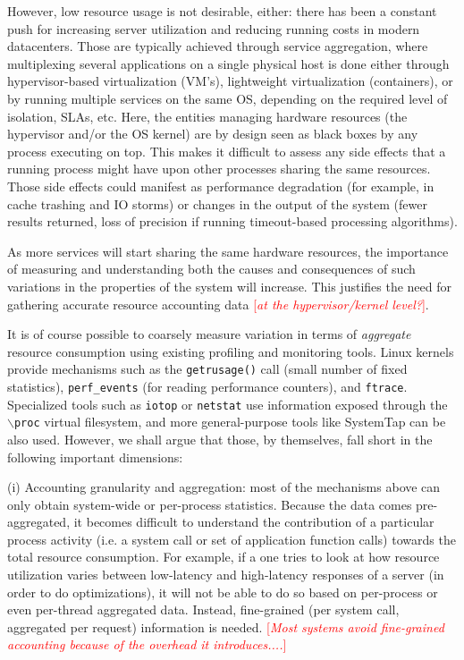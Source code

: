 \documentclass[letterpaper,twocolumn,10pt]{article}
\newcommand{\lnote}[1]{\textcolor{red}{[\textit{#1}]}} %
\begin{document}
However, low resource usage is not desirable, either: there has been a constant push for increasing server utilization and reducing running costs in modern datacenters. Those are typically achieved through service aggregation, where multiplexing several applications on a single physical host is done either through hypervisor-based virtualization (VM's), lightweight virtualization (containers), or by running multiple services on the same OS, depending on the required level of isolation, SLAs, etc. 
Here, the entities managing hardware resources (the hypervisor and/or the OS kernel) are by design seen as black boxes by any process executing on top. This makes it difficult to assess any side effects that a running process might have upon other processes sharing the same resources. Those side effects could manifest as performance degradation (for example, in cache trashing and IO storms) or changes in the output of the system (fewer results returned, loss of precision if running timeout-based processing algorithms).

As more services will start sharing the same hardware resources, the importance of measuring and understanding both the causes and consequences of such variations in the properties of the system will increase. This justifies the need for gathering accurate resource accounting data \lnote{at the hypervisor/kernel level?}.

It is of course possible to coarsely measure variation in terms of \textit{aggregate} resource consumption using existing profiling and monitoring tools. Linux kernels provide mechanisms such as the \texttt{getrusage()} call (small number of fixed statistics), \texttt{perf\_events} (for reading performance counters), and \texttt{ftrace}. Specialized tools such as \texttt{iotop} or \texttt{netstat} use information exposed through the \texttt{$\backslash$proc} virtual filesystem, and more general-purpose tools like SystemTap can be also used. However, we shall argue that those, by themselves, fall short in the following important dimensions: 

(i) Accounting granularity and aggregation: most of the mechanisms above can only obtain system-wide or per-process statistics. Because the data comes pre-aggregated, it becomes difficult to understand the contribution of a particular process activity (i.e. a system call or set of application function calls) towards the total resource consumption. For example, if a one tries to look at how resource utilization varies between low-latency and high-latency responses of a server (in order to do optimizations), it will not be able to do so based on per-process or even per-thread aggregated data. Instead, fine-grained (per system call, aggregated per request) information is needed. \lnote{Most systems avoid fine-grained accounting because of the overhead it introduces....}
\end{document}
